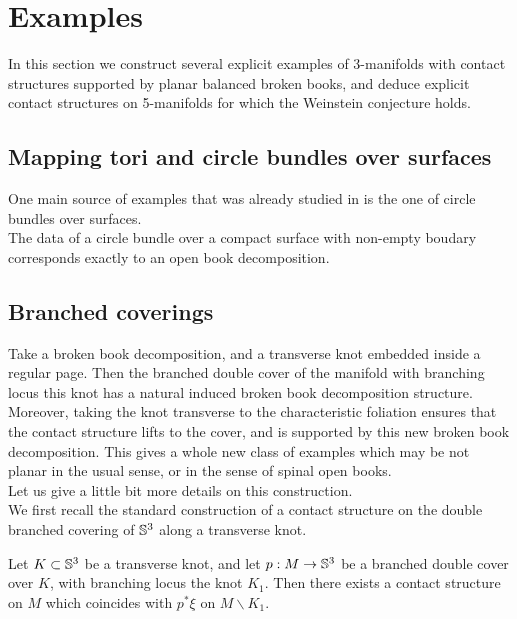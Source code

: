 \documentclass[../main.tex]{subfiles}
\begin{document}
\section{Examples}\label{p:VII}

In this section we construct several explicit examples of 3-manifolds with contact structures supported by planar balanced broken books, and deduce explicit contact structures on 5-manifolds for which the Weinstein conjecture holds.\\

\subsection{Mapping tori and circle bundles over surfaces}

One main source of examples that was already studied in \cite{SOBD1} is the one of circle bundles over surfaces. \\
The data of a circle bundle over a compact surface with non-empty boudary corresponds exactly to an open book decomposition.


\subsection{Branched coverings}

Take a broken book decomposition, and a transverse knot embedded inside a regular page. Then the branched double cover of the manifold with branching locus this knot has a natural induced broken book decomposition structure. Moreover, taking the knot transverse to the characteristic foliation ensures that the contact structure lifts to the cover, and is supported by this new broken book decomposition. This gives a whole new class of examples which may be not planar in the usual sense, or in the sense of spinal open books. \\

Let us give a little bit more details on this construction. \\

We first recall the standard construction of a contact structure on the double branched covering of $\mathbb{S}^3$ along a transverse knot.
\begin{lemma}
Let $K\subset \mathbb{S}^3$ be a transverse knot, and let $p : M\rightarrow \mathbb{S}^3$  be a branched double cover over $K$, with branching locus the knot $K_1$. Then there exists a contact structure on $M$ which coincides with $p^*\xi$ on $M\backslash K_1$.   
\end{lemma}
\end{document}
